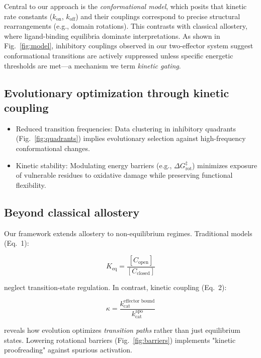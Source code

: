 \documentclass[a4paper,12pt]{article}
\begin{document}
	Central to our approach is the \textit{conformational model}, which posits that kinetic rate constants ($k_{\text{on}}$, $k_{\text{off}}$) and their couplings correspond to precise structural rearrangements (e.g., domain rotations). This contrasts with classical allostery, where ligand-binding equilibria dominate interpretations. As shown in Fig.~\ref{fig:model}, inhibitory couplings observed in our two-effector system suggest conformational transitions are actively suppressed unless specific energetic thresholds are met—a mechanism we term \textit{kinetic gating}.
	
	\subsection*{Evolutionary optimization through kinetic coupling}
	\begin{itemize}
		\item Reduced transition frequencies: Data clustering in inhibitory quadrants (Fig.~\ref{fig:quadrants}) implies evolutionary selection against high-frequency conformational changes. 
		\item Kinetic stability: Modulating energy barriers (e.g., $\Delta G^{\ddagger}_{\text{rot}}$) minimizes exposure of vulnerable residues to oxidative damage while preserving functional flexibility.
	\end{itemize}
	
	\subsection*{Beyond classical allostery}
	Our framework extends allostery to non-equilibrium regimes. Traditional models (Eq.~1):
	
	\begin{equation}
		K_{\text{eq}} = \frac{[C_{\text{open}}]}{[C_{\text{closed}}]}
	\end{equation}
	
	neglect transition-state regulation. In contrast, kinetic coupling (Eq.~2):
	
	\begin{equation}
		\kappa = \frac{k_{\text{cat}}^{\text{effector\ bound}}}{k_{\text{cat}}^{\text{apo}}}
	\end{equation}
	
	reveals how evolution optimizes \textit{transition paths} rather than just equilibrium states. Lowering rotational barriers (Fig.~\ref{fig:barriers}) implements "kinetic proofreading" against spurious activation.
	
\end{document}
